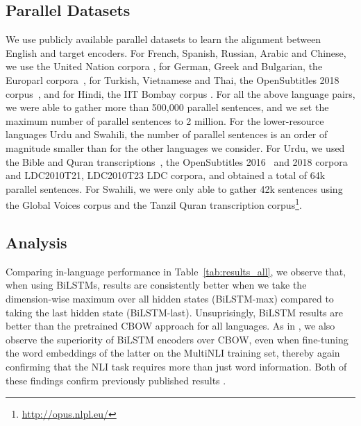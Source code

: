\documentclass[11pt,a4paper]{article}
\begin{document}
\subsection{Parallel Datasets}
\label{SectDataParallel}
We use publicly available parallel datasets to learn the alignment between English and target encoders. For French, Spanish, Russian,  Arabic and Chinese, we use the United Nation corpora \cite{ziemski2016united}, for German, Greek and Bulgarian, the Europarl corpora~\cite{koehn2005europarl}, for Turkish, Vietnamese and Thai, the OpenSubtitles 2018 corpus~\cite{TIEDEMANN12.463}, and for Hindi, the IIT Bombay corpus \cite{kunchukuttan2018iit}.  For all the above language pairs, we were able to gather more than 500,000 parallel sentences, and we set the maximum number of parallel sentences to 2 million.
For the lower-resource languages Urdu and Swahili, the number of parallel sentences is an order of magnitude smaller than for the other languages we consider. For Urdu, we used the Bible and Quran transcriptions~\cite{TIEDEMANN12.463}, the OpenSubtitles 2016~\cite{lison2016} and 2018 corpora and LDC2010T21, LDC2010T23 LDC corpora, and obtained a total of 64k parallel sentences. For Swahili, we were only able to gather 42k sentences using the Global Voices corpus and the Tanzil Quran transcription corpus\footnote{\url{http://opus.nlpl.eu/}}.

\insertevolution

\subsection{Analysis}


Comparing in-language performance in Table~\ref{tab:results_all}, we observe that, when using BiLSTMs, results are consistently better when we take the dimension-wise maximum over all hidden states (BiLSTM-max) compared to taking the last hidden state (BiLSTM-last). Unsuprisingly, BiLSTM results are better than the pretrained CBOW approach for all languages. As in \citet{bowman2015large}, we also observe the superiority of Bi\-LSTM encoders over CBOW, even when fine-tuning the word embeddings of the latter on the MultiNLI training set, thereby again confirming that the NLI task requires more than just word information. Both of these findings confirm previously published results \cite{conneau2017supervised}.
\end{document}
